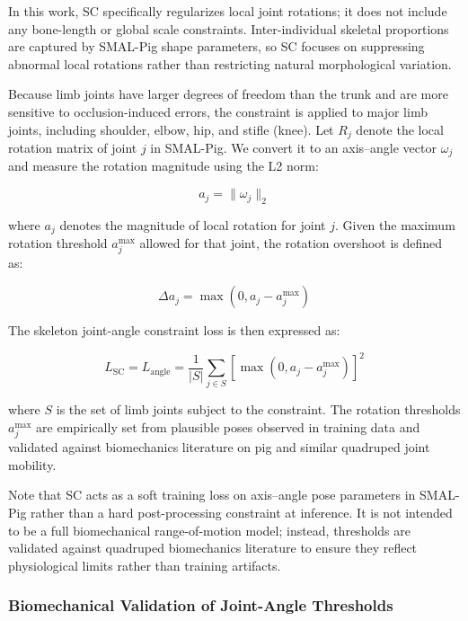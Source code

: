 \documentclass[computers,article,submit,pdftex,moreauthors]{mdpi}
\begin{document}
In this work, SC specifically regularizes local joint rotations; it does not include any bone-length or global scale constraints. Inter-individual skeletal proportions are captured by SMAL-Pig shape parameters, so SC focuses on suppressing abnormal local rotations rather than restricting natural morphological variation.

Because limb joints have larger degrees of freedom than the trunk and are more sensitive to occlusion-induced errors, the constraint is applied to major limb joints, including shoulder, elbow, hip, and stifle (knee). Let $R_j$ denote the local rotation matrix of joint $j$ in SMAL-Pig. We convert it to an axis--angle vector $\omega_j$ and measure the rotation magnitude using the L2 norm:

\begin{equation}
a_j = \|\omega_j\|_2
\end{equation}

where $a_j$ denotes the magnitude of local rotation for joint $j$. Given the maximum rotation threshold $a_j^{\max}$ allowed for that joint, the rotation overshoot is defined as:

\begin{equation}
\Delta a_j = \max(0, a_j - a_j^{\max})
\end{equation}

The skeleton joint-angle constraint loss is then expressed as:

\begin{equation}
L_{\text{SC}} = L_{\text{angle}} = \frac{1}{|S|} \sum_{j \in S} [\max(0, a_j - a_j^{\max})]^2
\end{equation}

where $S$ is the set of limb joints subject to the constraint. The rotation thresholds $a_j^{\max}$ are empirically set from plausible poses observed in training data and validated against biomechanics literature on pig and similar quadruped joint mobility.

Note that SC acts as a soft training loss on axis--angle pose parameters in SMAL-Pig rather than a hard post-processing constraint at inference. It is not intended to be a full biomechanical range-of-motion model; instead, thresholds are validated against quadruped biomechanics literature to ensure they reflect physiological limits rather than training artifacts.

\subsubsection{Biomechanical Validation of Joint-Angle Thresholds}\label{sec:biomech_validation}
\end{document}

